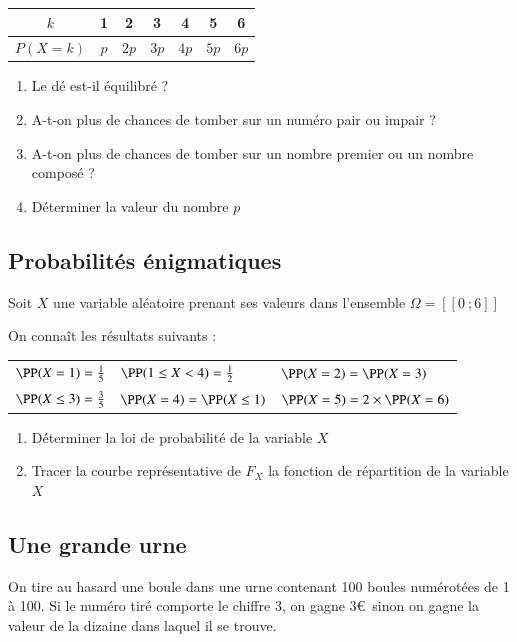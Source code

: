 \documentclass[oneside,12pt]{article}          %
\begin{document}
\begin{center}
\renewcommand{\arraystretch}{1.5}
\setlength{\tabcolsep}{15pt}
\begin{tabular}{|c|c|c|c|c|c|c|} \hline
    $k$ & 1 & 2 & 3 & 4 & 5 & 6 \\ \hline
    $P(X=k)$ & $p$ & $2p$ & $3p$ & $4p$ & $5p$ & $6p$ \\ \hline
\end{tabular}
\end{center}
\begin{enumerate}
    \item Le dé est-il équilibré ?
    \item A-t-on plus de chances de tomber sur un numéro pair ou impair ?
    \item A-t-on plus de chances de tomber sur un nombre premier ou un nombre composé ?
    \item Déterminer la valeur du nombre $p$
\end{enumerate}


\subsection{Probabilités énigmatiques}
Soit $X$ une variable aléatoire prenant ses valeurs dans l'ensemble $\Omega=[\![0~;6]\!]$

On connaît les résultats suivants : 

\begin{tabular}{p{5cm}p{5cm}p{5cm}}
    $\PP(X=1)=\frac{1}{5}$ & $\PP(1\leq X<4)=\frac{1}{2}$ & $\PP(X=2)=\PP(X=3)$ \\[5pt]
    $\PP(X\leq3)=\frac{3}{5}$ & $\PP(X=4)=\PP(X\leq1)$ & $\PP(X=5)=2\times\PP(X=6)$
\end{tabular}
\begin{enumerate}
	\item Déterminer la loi de probabilité de la variable $X$
	\item Tracer la courbe représentative de $F_X$ la fonction de répartition de la variable $X$
\end{enumerate}



\subsection{Une grande urne}
On tire au hasard une boule dans une urne contenant 100 boules numérotées de 1 à 100. Si le numéro tiré comporte le chiffre 3, on gagne 3\euro\, sinon on gagne la valeur de la dizaine dans laquel il se trouve.
\end{document}
